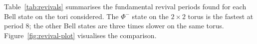 Table~\ref{tab:revivals} summarises the fundamental revival periods
found for each Bell state on the tori considered. The $\Phi^-$ state on
the $2 \times 2$ torus is the fastest at period 8; the other Bell states
are three times slower on the same torus. Figure~\ref{fig:revival-plot}
visualises the comparison.
